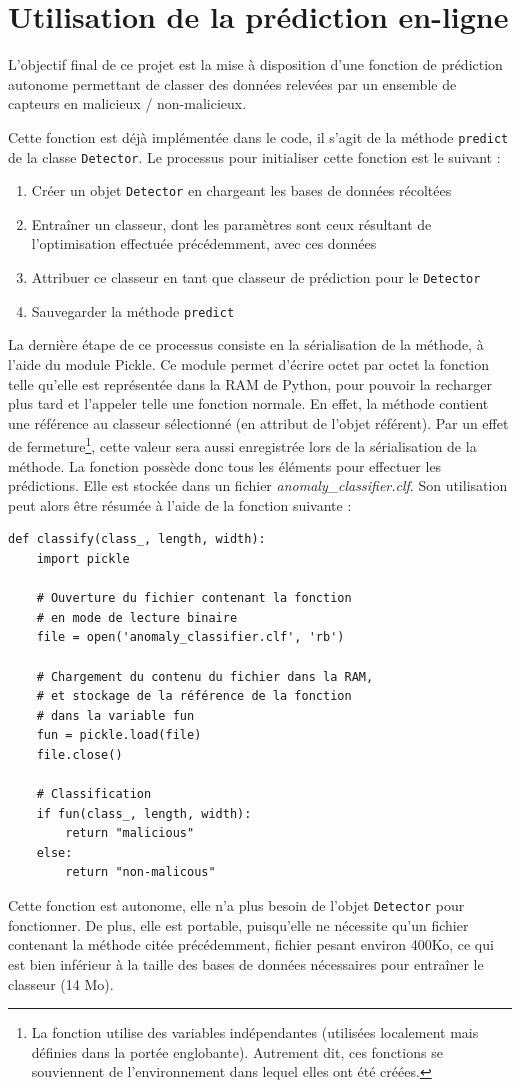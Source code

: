 \documentclass[a4paper]{report}
\begin{document}
\section{Utilisation de la prédiction en-ligne}

L'objectif final de ce projet est la mise à disposition d'une fonction de prédiction autonome permettant de classer des données relevées par un ensemble de capteurs en malicieux / non-malicieux.

Cette fonction est déjà implémentée dans le code, il s'agit de la méthode \texttt{predict} de la classe \texttt{Detector}. Le processus pour initialiser cette fonction est le suivant :
\begin{enumerate}
\item Créer un objet \texttt{Detector} en chargeant les bases de données récoltées
\item Entraîner un classeur, dont les paramètres sont ceux résultant de l'optimisation effectuée précédemment, avec ces données
\item Attribuer ce classeur en tant que classeur de prédiction pour le \texttt{Detector}
\item Sauvegarder la méthode \texttt{predict}
\end{enumerate}
La dernière étape de ce processus consiste en la sérialisation de la méthode, à l'aide du module Pickle. Ce module permet d'écrire octet par octet la fonction telle qu'elle est représentée dans la RAM de Python, pour pouvoir la recharger plus tard et l'appeler telle une fonction normale. En effet, la méthode contient une référence au classeur sélectionné (en attribut de l'objet référent). Par un effet de fermeture\footnote{La fonction utilise des variables indépendantes (utilisées localement mais définies dans la portée englobante). Autrement dit, ces fonctions se souviennent de l'environnement dans lequel elles ont été créées.}, cette valeur sera aussi enregistrée lors de la sérialisation de la méthode. La fonction possède donc tous les éléments pour effectuer les prédictions. Elle est stockée dans un fichier \emph{anomaly\_classifier.clf}. Son utilisation peut alors être résumée à l'aide de la fonction suivante :
\begin{verbatim}
def classify(class_, length, width):
    import pickle
    
    # Ouverture du fichier contenant la fonction
    # en mode de lecture binaire
    file = open('anomaly_classifier.clf', 'rb')
    
    # Chargement du contenu du fichier dans la RAM,
    # et stockage de la référence de la fonction
    # dans la variable fun
    fun = pickle.load(file)
    file.close()
    
    # Classification
    if fun(class_, length, width):
        return "malicious"
    else:
        return "non-malicous"
\end{verbatim}
Cette fonction est autonome, elle n'a plus besoin de l'objet \texttt{Detector} pour fonctionner. De plus, elle est portable, puisqu'elle ne nécessite qu'un fichier contenant la méthode citée précédemment, fichier pesant environ 400Ko, ce qui est bien inférieur à la taille des bases de données nécessaires pour entraîner le classeur (14 Mo).
\end{document}
